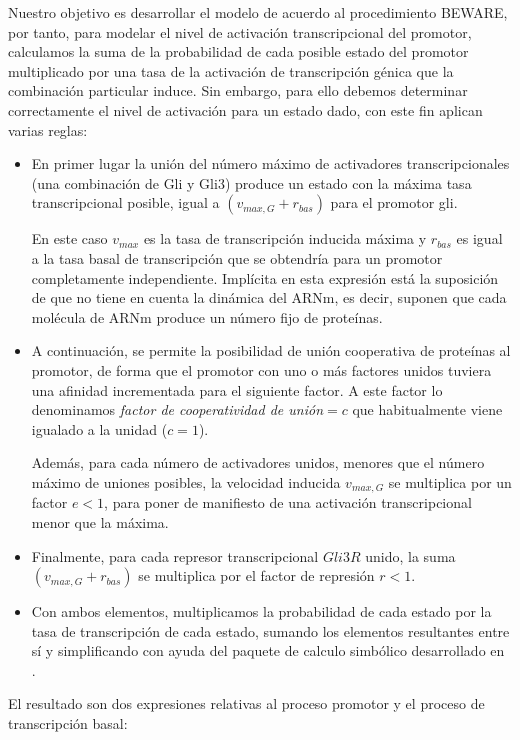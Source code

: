   
  Nuestro objetivo es desarrollar el modelo de acuerdo al procedimiento BEWARE, por tanto, para modelar el nivel de activación transcripcional del promotor, calculamos la suma de la probabilidad de cada posible estado del promotor multiplicado por una tasa de la activación de transcripción génica que la combinación particular
  induce.
  Sin embargo, para ello debemos determinar correctamente  el nivel de activación para un estado dado, con este fin \cite{schaffer,saha} aplican varias reglas:
   \begin{itemize}
   	 
   
   \item En primer lugar la unión del número máximo de activadores transcripcionales (una combinación de Gli y Gli3) produce un estado con la máxima tasa transcripcional  posible, igual a $(v_{max,G} + r_{bas})$ para el promotor gli.
  
  En este caso $v_{max}$ es la tasa de transcripción inducida máxima y $r_{bas}$ es igual a la tasa basal de transcripción que se obtendría para un promotor completamente independiente.
   Implícita en esta expresión está la suposición de que \cite{schaffer} no tiene en cuenta la dinámica del ARNm, es decir, suponen que cada molécula de ARNm produce un número fijo de proteínas. 
   
   
  \item A continuación, se permite la posibilidad de unión cooperativa de proteínas al promotor, de forma que el promotor con uno o más factores unidos tuviera una afinidad incrementada para el siguiente factor. A este factor lo denominamos \textit{factor de cooperatividad de unión}$=c$ que habitualmente viene igualado a la unidad ($c=1$).
  
   Además, para cada número de activadores unidos, menores que el número máximo de uniones posibles, la velocidad inducida $v_{max, G}$ se multiplica por un factor $e<1$, para poner de manifiesto de una activación transcripcional menor que la máxima. 

\item Finalmente, para cada represor transcripcional $Gli3R$ unido, la suma $(v_{max, G}+ r_{bas})$ se multiplica por el factor de represión $r<1$.
  
\item Con ambos elementos, multiplicamos la probabilidad de cada estado por la tasa de transcripción de cada estado, sumando los elementos resultantes entre sí y simplificando con ayuda del paquete de calculo simbólico desarrollado en \cite{sympy}. 
\end{itemize}
 El resultado son dos expresiones relativas al proceso promotor y el proceso de transcripción basal:

